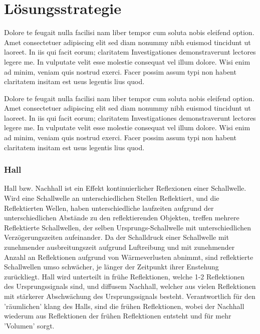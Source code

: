 \documentclass[a4paper,12pt,fontsize=12,DIV=12]{scrartcl}
\begin{document}
\section{Lösungsstrategie}
Dolore te feugait nulla facilisi nam liber tempor cum soluta nobis eleifend option. Amet consectetuer adipiscing elit sed diam nonummy nibh euismod tincidunt ut laoreet. In iis qui facit eorum; claritatem Investigationes demonstraverunt lectores legere me. In vulputate velit esse molestie consequat vel illum dolore. Wisi enim ad minim, veniam quis nostrud exerci. Facer possim assum typi non habent claritatem insitam est usus legentis lius quod.

Dolore te feugait nulla facilisi nam liber tempor cum soluta nobis eleifend option. Amet consectetuer adipiscing elit sed diam nonummy nibh euismod tincidunt ut laoreet. In iis qui facit eorum; claritatem Investigationes demonstraverunt lectores legere me. In vulputate velit esse molestie consequat vel illum dolore. Wisi enim ad minim, veniam quis nostrud exerci. Facer possim assum typi non habent claritatem insitam est usus legentis lius quod.

\subsubsection{Hall}
Hall bzw. Nachhall ist ein Effekt kontinuierlicher Reflexionen einer Schallwelle.
Wird eine Schallwelle an unterschiedlichen Stellen Reflektiert, und die Reflektierten Wellen, haben unterschiedliche laufzeiten aufgrund der unterschiedlichen Abstände zu den reflektierenden Objekten, treffen mehrere Reflektierte Schallwellen, der selben Ursprungs-Schallwelle mit unterschiedlichen Verzögerungszeiten aufeinander. Da der Schalldruck einer Schallwelle mit zunehmender ausbreitungszeit aufgrund Luftreibung und mit zunehmender Anzahl an Reflektionen aufgrund von Wärmeverlusten abnimmt, sind reflektierte Schallwellen umso schwächer, je länger der Zeitpunkt ihrer Enstehung zurückliegt.
Hall wird unterteilt in frühe Reflektionen, welche 1-2 Reflektionen des Ursprungssignals sind, und diffusem Nachhall, welcher aus vielen Reflektionen mit stärkerer Abschwächung des Ursprungssignals besteht. Verantwortlich für den 'räumlichen' klang des Halls, sind die frühen Reflektionen, wobei der Nachhall wiederum aus Reflektionen der frühen Reflektionen entsteht und für mehr 'Volumen' sorgt.
\end{document}
